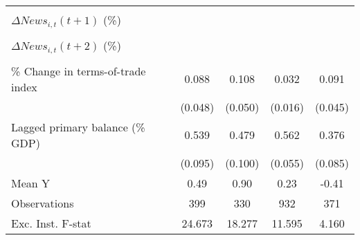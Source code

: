 {\begin{tabular}{l*{4}{c}}
                    &                     &                     &                     &                     \\
\addlinespace
$ \Delta News_{i,t}(t+1)$ (\%)&                     &                     &                     &                     \\
                    &                     &                     &                     &                     \\
\addlinespace
$ \Delta News_{i,t}(t+2)$ (\%)&                     &                     &                     &                     \\
                    &                     &                     &                     &                     \\
\addlinespace
\% Change in terms-of-trade index&       0.088\sym{*}  &       0.108\sym{**} &       0.032\sym{**} &       0.091\sym{**} \\
                    &     (0.048)         &     (0.050)         &     (0.016)         &     (0.045)         \\
\addlinespace
Lagged primary balance (\% GDP)&       0.539\sym{***}&       0.479\sym{***}&       0.562\sym{***}&       0.376\sym{***}\\
                    &     (0.095)         &     (0.100)         &     (0.055)         &     (0.085)         \\
\midrule
Mean Y              &        0.49         &        0.90         &        0.23         &       -0.41         \\
Observations        &         399         &         330         &         932         &         371         \\
Exc. Inst. F-stat   &      24.673         &      18.277         &      11.595         &       4.160         \\
\bottomrule
\end{tabular}
}
